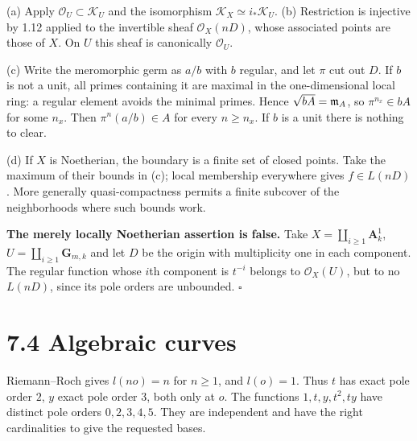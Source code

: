 \documentclass[11pt]{article}
\let\chapterexercise\exercise
\renewcommand{\exercise}[2]{\Needspace{8\baselineskip}\chapterexercise{#1}{#2}}
\begin{document}
\pf
(a) Apply $\mathcal O_U\subset\mathcal K_U$ and the isomorphism $\mathcal K_X\simeq i_*\mathcal K_U$. (b) Restriction is injective by 1.12 applied to the invertible sheaf $\mathcal O_X(nD)$, whose associated points are those of $X$. On $U$ this sheaf is canonically $\mathcal O_U$.

(c) Write the meromorphic germ as $a/b$ with $b$ regular, and let $\pi$ cut out $D$. If $b$ is not a unit, all primes containing it are maximal in the one-dimensional local ring: a regular element avoids the minimal primes. Hence $\sqrt{bA}=\mathfrak m_A$, so $\pi^{n_x}\in bA$ for some $n_x$. Then $\pi^n(a/b)\in A$ for every $n\ge n_x$. If $b$ is a unit there is nothing to clear.

(d) If $X$ is Noetherian, the boundary is a finite set of closed points. Take the maximum of their bounds in (c); local membership everywhere gives $f\in L(nD)$. More generally quasi-compactness permits a finite subcover of the neighborhoods where such bounds work.

\textbf{The merely locally Noetherian assertion is false.} Take $X=\coprod_{i\ge1}\mathbf A^1_k$, $U=\coprod_{i\ge1}\mathbf G_{m,k}$ and let $D$ be the origin with multiplicity one in each component. The regular function whose $i$th component is $t^{-i}$ belongs to $\mathcal O_X(U)$, but to no $L(nD)$, since its pole orders are unbounded. \hfill$\square$

\section*{7.4 Algebraic curves}

\pf
Riemann--Roch gives $l(no)=n$ for $n\ge1$, and $l(o)=1$. Thus $t$ has exact pole order $2$, $y$ exact pole order $3$, both only at $o$. The functions $1,t,y,t^2,ty$ have distinct pole orders $0,2,3,4,5$. They are independent and have the right cardinalities to give the requested bases.
\end{document}
